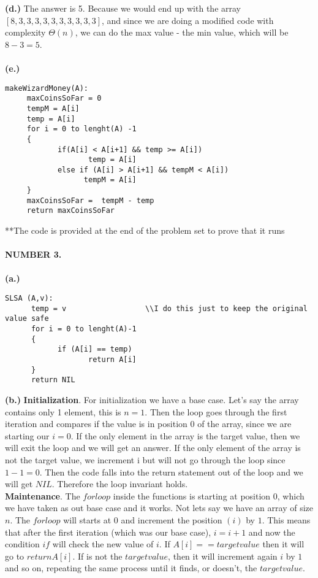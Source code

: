 \documentclass[10pt]{article}
\begin{document}
\textbf{(d.)} The answer is 5. Because we would end up with the array $[8,3,3,3,3,3,3,3,3,3,3]$, and since we are doing a modified code with complexity $\Theta(n)$, we can do the max value - the min value, which will be $8-3 =5$.\\\\
\textbf{(e.)} \begin{verbatim}
makeWizardMoney(A):
     maxCoinsSoFar = 0
     tempM = A[i]
     temp = A[i]
     for i = 0 to lenght(A) -1
     { 
            if(A[i] < A[i+1] && temp >= A[i])
                   temp = A[i]
            else if (A[i] > A[i+1] && tempM < A[i])
                  tempM = A[i]
     }
     maxCoinsSoFar =  tempM - temp
     return maxCoinsSoFar \end{verbatim}
**The code is provided at the end of the problem set to prove that it runs\\\\
\textbf{NUMBER 3.} \\\\
\textbf{(a.)} \begin{verbatim}
SLSA (A,v):
      temp = v			       	\\I do this just to keep the original value safe
      for i = 0 to lenght(A)-1
      {
            if (A[i] == temp)
                   return A[i]
      }
      return NIL \end{verbatim}
\textbf{(b.)} \textbf{Initialization}. For initialization we have a base case. Let's say the array contains only 1 element, this is $n=1$. Then the loop goes through the first iteration and compares if the value is in position 0 of the array, since we are starting our $i=0$. If the only element in the array is the target value, then we will exit the loop and we will get an answer. If the only element of the array is not the target value, we increment i but will not go through the loop since $1-1=0$. Then the code falls into the return statement out of the loop and we will get $NIL$. Therefore the loop invariant holds. \\
\textbf{Maintenance}. The $for loop$ inside the functions is starting at position $0$, which we have taken as out base case and it works. Not lets say we have an array of size $n$. The $for loop$ will starts at $0$ and increment the position $(i)$ by $1$. This means that after the first iteration (which was our base case), $i = i+1$ and now the condition $if$ will check the new value of $i$. If $A[i] == target value$ then it will go to $return A[i]$. If is not the $target value$, then it will increment again $i$ by $1$ and so on, repeating the same process until it finds, or doesn't, the $target value$.\\
\end{document}
